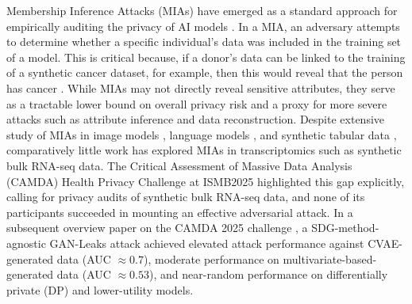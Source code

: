 \documentclass[11pt]{article}
\newcommand{\martine}[1]{\textcolor{magenta}{Martine: #1}}
\newcommand{\sikha}[1]{\textcolor{blue}{Sikha: #1}}
\begin{document}
Membership Inference Attacks (MIAs) have emerged as a standard approach for empirically auditing the privacy of AI models \cite{shokri2017membership}. In a MIA, an adversary attempts to determine whether a specific individual’s data was included in the training set of a model. This is critical because, if a donor’s data can be linked to the training of a synthetic cancer dataset, for example, then this would reveal that the person has cancer \cite{zhang_membership_2022}.
While MIAs may not directly reveal sensitive attributes, they serve as a tractable lower bound on overall privacy risk and a proxy for more severe attacks such as attribute inference and data reconstruction. 
Despite extensive study of MIAs in image models \cite{shokri2017membership}, language models \cite{carlini2022membership}, and synthetic tabular data \cite{golob2024privacy, stadler2022synthetic, wu2025winning}, comparatively little work has explored MIAs in transcriptomics such as synthetic bulk RNA-seq data. The Critical Assessment of Massive Data Analysis (CAMDA) Health Privacy Challenge at ISMB2025 highlighted this gap explicitly, calling for privacy audits of synthetic bulk RNA-seq data, and none of its participants succeeded in mounting an effective adversarial attack. In a subsequent overview paper on the CAMDA 2025 challenge \cite{ozturk2026towards}, a SDG-method-agnostic GAN-Leaks attack \cite{chen2020gan} achieved elevated attack performance against CVAE-generated data (AUC $\approx 0.7$), moderate performance on multivariate-based-generated data (AUC $\approx 0.53$), and near-random performance on differentially private (DP) and lower-utility models.
\end{document}
